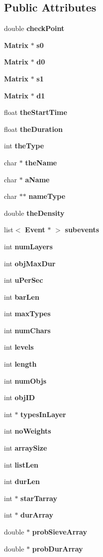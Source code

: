 \subsection*{Public Attributes}
\begin{CompactItemize}
\item 
double {\bf check\-Point}
\item 
{\bf Matrix} $\ast$ {\bf s0}
\item 
{\bf Matrix} $\ast$ {\bf d0}
\item 
{\bf Matrix} $\ast$ {\bf s1}
\item 
{\bf Matrix} $\ast$ {\bf d1}
\item 
float {\bf the\-Start\-Time}
\item 
float {\bf the\-Duration}
\item 
int {\bf the\-Type}
\item 
char $\ast$ {\bf the\-Name}
\item 
char $\ast$ {\bf a\-Name}
\item 
char $\ast$$\ast$ {\bf name\-Type}
\item 
double {\bf the\-Density}
\item 
list$<$ {\bf Event} $\ast$ $>$ {\bf subevents}
\item 
int {\bf num\-Layers}
\item 
int {\bf obj\-Max\-Dur}
\item 
int {\bf u\-Per\-Sec}
\item 
int {\bf bar\-Len}
\item 
int {\bf max\-Types}
\item 
int {\bf num\-Chars}
\item 
int {\bf levels}
\item 
int {\bf length}
\item 
int {\bf num\-Objs}
\item 
int {\bf obj\-ID}
\item 
int $\ast$ {\bf types\-In\-Layer}
\item 
int {\bf no\-Weights}
\item 
int {\bf array\-Size}
\item 
int {\bf list\-Len}
\item 
int {\bf dur\-Len}
\item 
int $\ast$ {\bf star\-Tarray}
\item 
int $\ast$ {\bf dur\-Array}
\item 
double $\ast$ {\bf prob\-Sieve\-Array}
\item 
double $\ast$ {\bf prob\-Dur\-Array}
\item 
$$
\end{CompactItemize}
